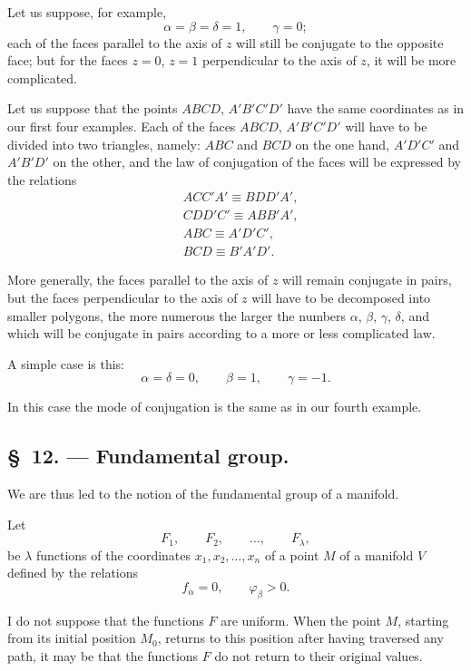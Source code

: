 \documentclass{article}
\begin{document}
Let us suppose, for example,
\[ \alpha = \beta = \delta = 1, \qquad \gamma = 0; \]
each of the faces parallel to the axis of $z$ will still be conjugate to the opposite face; but for the faces $z = 0$, $z = 1$ perpendicular to the axis of $z$, it will be more complicated.

Let us suppose that the points $ABCD$, $A'B'C'D'$ have the same coordinates as in our first four examples. Each of the faces $ABCD$, $A'B'C'D'$ will have to be divided into two triangles, namely: $ABC$ and $BCD$ on the one hand, $A'D'C'$ and $A'B'D'$ on the other, and the law of conjugation of the faces will be expressed by the relations
\[ \begin{aligned} &ACC'A' \equiv BDD'A',\\ &CDD'C' \equiv ABB'A',\\ &ABC \equiv A'D'C',\\ &BCD \equiv B'A'D'. \end{aligned} \]

More generally, the faces parallel to the axis of $z$ will remain conjugate in pairs, but the faces perpendicular to the axis of $z$ will have to be decomposed into smaller polygons, the more numerous the larger the numbers $\alpha$, $\beta$, $\gamma$, $\delta$, and which will be conjugate in pairs according to a more or less complicated law.

A simple case is this:
\[ \alpha = \delta = 0, \qquad \beta = 1, \qquad \gamma = -1. \]

In this case the mode of conjugation is the same as in our fourth example.

\subsection*{\S~12. --- Fundamental group.}

We are thus led to the notion of the fundamental group of a manifold.

Let
\[ F_{1}, \qquad F_{2}, \qquad \ldots, \qquad F_{\lambda}, \]
be $\lambda$ functions of the coordinates $x_{1}, x_{2}, \ldots, x_{n}$ of a point $M$ of a manifold $V$ defined by the relations
\[ f_{\alpha} = 0, \qquad \varphi_{\beta} > 0. \]

I do not suppose that the functions $F$ are uniform. When the point $M$, starting from its initial position $M_{0}$, returns to this position after having traversed any path, it may be that the functions $F$ do not return to their original values.
\end{document}

